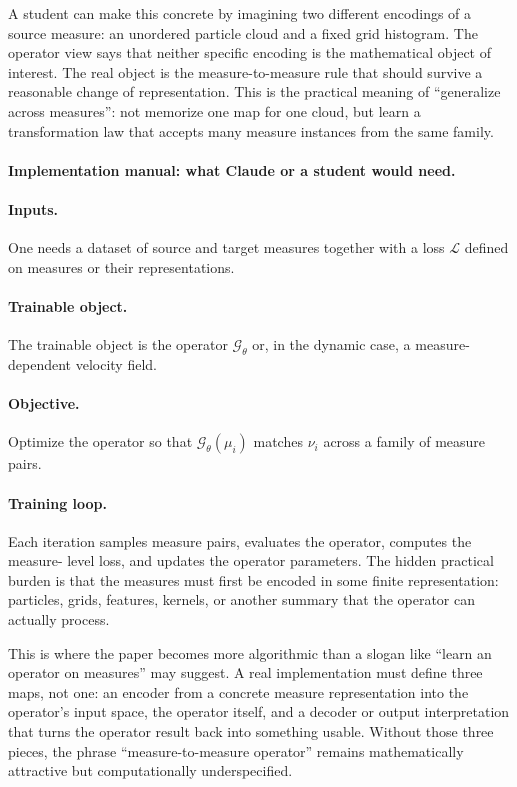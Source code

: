 \documentclass[11pt]{report}
\begin{document}
A student can make this concrete by imagining two different encodings of a source
measure: an unordered particle cloud and a fixed grid histogram.  The operator view
says that neither specific encoding is the mathematical object of interest.  The real
object is the measure-to-measure rule that should survive a reasonable change of
representation.  This is the practical meaning of ``generalize across measures'': not
memorize one map for one cloud, but learn a transformation law that accepts many
measure instances from the same family.

\paragraph{Implementation manual: what Claude or a student would need.}
\paragraph{Inputs.}
One needs a dataset of source and target measures together with a loss
$\mathcal L$ defined on measures or their representations.

\paragraph{Trainable object.}
The trainable object is the operator $\mathcal G_\theta$ or, in the dynamic case, a
measure-dependent velocity field.

\paragraph{Objective.}
Optimize the operator so that $\mathcal G_\theta(\mu_i)$ matches $\nu_i$ across a
family of measure pairs.

\paragraph{Training loop.}
Each iteration samples measure pairs, evaluates the operator, computes the measure-
level loss, and updates the operator parameters.  The hidden practical burden is that
the measures must first be encoded in some finite representation: particles, grids,
features, kernels, or another summary that the operator can actually process.

This is where the paper becomes more algorithmic than a slogan like ``learn an
operator on measures'' may suggest.  A real implementation must define three maps,
not one: an encoder from a concrete measure representation into the operator's input
space, the operator itself, and a decoder or output interpretation that turns the
operator result back into something usable.  Without those three pieces, the phrase
``measure-to-measure operator'' remains mathematically attractive but computationally
underspecified.
\end{document}
